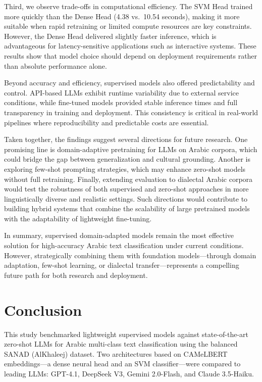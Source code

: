 \documentclass[preprint,12pt,authoryear]{elsarticle}
\begin{document}
Third, we observe trade-offs in computational efficiency. The SVM Head trained more quickly than the Dense Head (4.38 vs.\ 10.54 seconds), making it more suitable when rapid retraining or limited compute resources are key constraints. However, the Dense Head delivered slightly faster inference, which is advantageous for latency-sensitive applications such as interactive systems. These results show that model choice should depend on deployment requirements rather than absolute performance alone.

Beyond accuracy and efficiency, supervised models also offered predictability and control. API-based LLMs exhibit runtime variability due to external service conditions, while fine-tuned models provided stable inference times and full transparency in training and deployment. This consistency is critical in real-world pipelines where reproducibility and predictable costs are essential.

Taken together, the findings suggest several directions for future research. One promising line is domain-adaptive pretraining for LLMs on Arabic corpora, which could bridge the gap between generalization and cultural grounding. Another is exploring few-shot prompting strategies, which may enhance zero-shot models without full retraining. Finally, extending evaluation to dialectal Arabic corpora would test the robustness of both supervised and zero-shot approaches in more linguistically diverse and realistic settings. Such directions would contribute to building hybrid systems that combine the scalability of large pretrained models with the adaptability of lightweight fine-tuning.

In summary, supervised domain-adapted models remain the most effective solution for high-accuracy Arabic text classification under current conditions. However, strategically combining them with foundation models—through domain adaptation, few-shot learning, or dialectal transfer—represents a compelling future path for both research and deployment.

\section{Conclusion}
\label{conclusion}

This study benchmarked lightweight supervised models against state-of-the-art zero-shot LLMs for Arabic multi-class text classification using the balanced SANAD (AlKhaleej) dataset. Two architectures based on CAMeLBERT embeddings—a dense neural head and an SVM classifier—were compared to leading LLMs: GPT-4.1, DeepSeek V3, Gemini 2.0-Flash, and Claude 3.5-Haiku.
\end{document}
